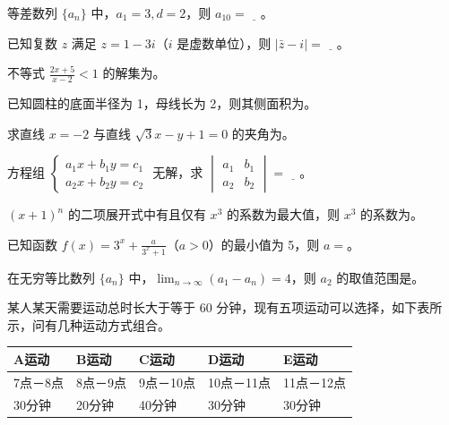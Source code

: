\begin{question}
等差数列 $\{a_n\}$ 中，$a_1=3,d=2$，则 $a_{10}=\underline{\quad}$。

\end{question}
\begin{question}
已知复数 $z$ 满足 $z=1-3i$（$i$ 是虚数单位），则 $|\bar z-i|=\underline{\quad}$。

\end{question}
\begin{question}
不等式 $\frac{2x+5}{x-2}<1$ 的解集为\gkblank{}。

\end{question}
\begin{question}
已知圆柱的底面半径为 1，母线长为 2，则其侧面积为\gkblank{}。

\end{question}
\begin{question}
求直线 $x=-2$ 与直线 $\sqrt3x-y+1=0$ 的夹角为\gkblank{}。

\end{question}
\begin{question}
方程组 $\begin{cases}a_1x+b_1y=c_1\\a_2x+b_2y=c_2\end{cases}$ 无解，求 $\begin{vmatrix}a_1&b_1\\a_2&b_2\end{vmatrix}=\underline{\quad}$。

\end{question}
\begin{question}
$(x+1)^n$ 的二项展开式中有且仅有 $x^3$ 的系数为最大值，则 $x^3$ 的系数为\gkblank{}。

\end{question}
\begin{question}
已知函数 $f(x)=3^x+\frac a{3^x+1}$（$a>0$）的最小值为 5，则 $a=$\gkblank{}。

\end{question}
\begin{question}
在无穷等比数列 $\{a_n\}$ 中，$\lim_{n\to\infty}(a_1-a_n)=4$，则 $a_2$ 的取值范围是\gkblank{}。

\end{question}
\begin{question}
某人某天需要运动总时长大于等于 60 分钟，现有五项运动可以选择，如下表所示，问有几种运动方式组合\gkblank{}。

\begin{center}
\begin{tabular}{lllll}
\toprule
A运动 & B运动 & C运动 & D运动 & E运动 \\
\midrule
7点－8点 & 8点－9点 & 9点－10点 & 10点－11点 & 11点－12点 \\
30分钟 & 20分钟 & 40分钟 & 30分钟 & 30分钟 \\
\bottomrule
\end{tabular}
\end{center}

\end{question}
